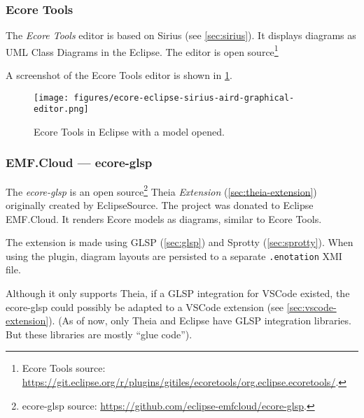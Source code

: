 \subsubsection{Ecore Tools} %
The \emph{Ecore Tools} editor is based on Sirius (see \cref{sec:sirius}).
It displays diagrams as \gls{UML} Class Diagrams in the \gls{Eclipse}.
The editor is \gls{open source}\footnote{Ecore Tools source: \href{https://git.eclipse.org/r/plugins/gitiles/ecoretools/org.eclipse.ecoretools/}{https://git.eclipse.org/r/plugins/gitiles/ecoretools/org.eclipse.ecoretools/}.}

A screenshot of the Ecore Tools editor is shown in \cref{fig:ecore-tools-screenshot}.

\begin{figure}[htbp]  %
  \centering
  \texttt{[image: figures/ecore-eclipse-sirius-aird-graphical-editor.png]}
  \caption[Ecore Tools Screenshot]{Ecore Tools in \gls{Eclipse} with a model opened.}\label{fig:ecore-tools-screenshot}
\end{figure}


\subsubsection{EMF.Cloud --- ecore-glsp} %
The \emph{ecore-glsp} is an \gls{open source}\footnote{ecore-glsp source: \href{https://github.com/eclipse-emfcloud/ecore-glsp}{https://github.com/eclipse-emfcloud/ecore-glsp}.} \gls{Theia} \emph{Extension} (\cref{sec:theia-extension}) originally created by EclipseSource.
The project was donated to Eclipse EMF.Cloud.
It renders \gls{Ecore} models as diagrams, similar to Ecore Tools.

The extension is made using \gls{GLSP} (\cref{sec:glsp}) and Sprotty (\cref{sec:sprotty}).
When using the plugin, diagram layouts are persisted to a separate \texttt{.enotation} \gls{XMI} file.~\cite{camilleletavernierEclipseemfcloudEcoreglsp2020}

Although it only supports \gls{Theia}, if a \gls{GLSP} integration for \gls{VSCode} existed, the ecore-glsp could possibly be adapted to a VSCode extension (see \cref{sec:vscode-extension}). (As of now, only \gls{Theia} and \gls{Eclipse} have \gls{GLSP} integration libraries. But these libraries are mostly ``glue code'').

